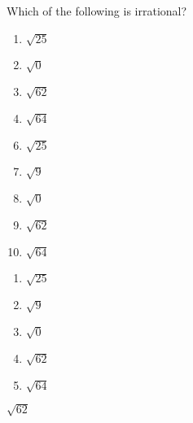 
 Which of the following is irrational?


\ifsat
	\begin{enumerate}[label=\Alph*)]
		\item   $\sqrt{25}$
		\item  $\sqrt{0}$
		\item  $\sqrt{62}$%
		\item   $\sqrt{64}$
	\end{enumerate}
\else
\fi

\ifacteven
	\begin{enumerate}[label=\textbf{\Alph*.},itemsep=\fill,align=left]
		\setcounter{enumii}{5}
		\item   $\sqrt{25}$
		\item  $\sqrt{9}$
		\item  $\sqrt{0}$
		\addtocounter{enumii}{1}
		\item  $\sqrt{62}$%
		\item   $\sqrt{64}$
	\end{enumerate}
\else
\fi

\ifactodd
	\begin{enumerate}[label=\textbf{\Alph*.},itemsep=\fill,align=left]
		\item   $\sqrt{25}$
		\item  $\sqrt{9}$
		\item  $\sqrt{0}$
		\item  $\sqrt{62}$%
		\item   $\sqrt{64}$
	\end{enumerate}
\else
\fi

\ifgridin
  $\sqrt{62}$%
		
\else
\fi

